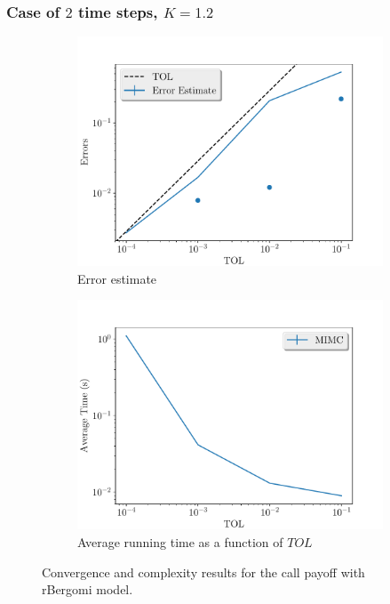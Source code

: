 \documentclass[11pt]{article}
\begin{document}
\subsubsection*{Case of $2$ time steps, $K=1.2$}
\begin{figure}[!h]
	\centering
	\begin{subfigure}{.5\textwidth}
		\centering
		\includegraphics[width=1\linewidth]{./figures/rbergomi_2_steps_K_1_2/error_estimate.pdf}
		\caption{Error estimate}
		\label{fig:misc_rbergomi_2_steps_K_1_2_sub1}
	\end{subfigure}%
	\begin{subfigure}{.5\textwidth}
		\centering
		\includegraphics[width=1\linewidth]{./figures/rbergomi_2_steps_K_1_2/average_running_time.pdf}
		\caption{Average running time as a function of $TOL$}
		\label{fig:misc_rbergomi_2_steps_K_1_1_sub2}
	\end{subfigure}%
	\caption{Convergence and complexity results for the call payoff with rBergomi model.}
	\label{fig:misc_rbergomi_2_steps_K_1_2_1}
\end{figure}
\end{document}
